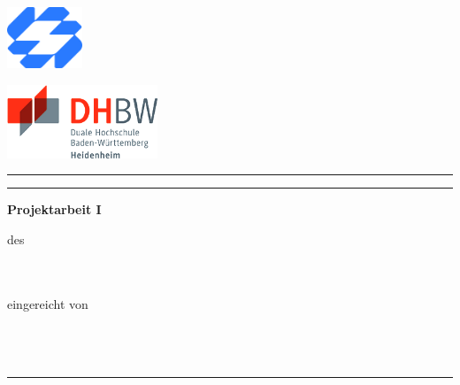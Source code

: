 \begin{titlepage}
	\noindent
	\begin{minipage}{0.45\textwidth}
		\includegraphics[width=2.25cm]{deckblatt/logos/company_logo.png}
	\end{minipage}
	\hfill
	\begin{minipage}{0.45\textwidth}
		\raggedleft
		\includegraphics[width=4.5cm]{deckblatt/logos/dhbw_logo.png}
	\end{minipage}

	\centering
	\vspace*{1.5cm}

	\begin{center}
		\rule{\textwidth}{0.6pt}
	\end{center}

	{\large\bfseries \projecttitle \par}

	\begin{center}
		\rule{\textwidth}{0.6pt}
	\end{center}

	{\large\bfseries Projektarbeit I\par}

	\vspace{0.5cm}
	{\normalsize des \degreeprogram\\
		\faculty\\
		\university\\
		\universitycity\par}

	\vspace{0.5cm}
	{\normalsize eingereicht von\\[0.1cm]
		\textbf{\studentname} \\
		\textbf{\studentaddress} \\
		\textbf{\studentcity} \\
	}

	\begin{center}
		\rule{\textwidth}{0.6pt}
	\end{center}


\end{titlepage}
